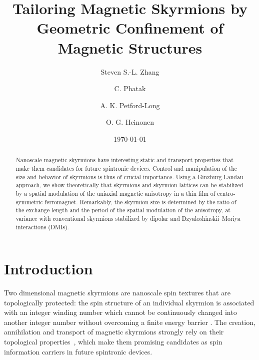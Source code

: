 \documentclass[10pt,onecolumn,prb,aps,notitlepage]{revtex4}
\begin{document}
\title{Tailoring Magnetic Skyrmions by Geometric Confinement of Magnetic Structures}
\author{Steven S.-L. Zhang}
\author{C. Phatak}
\author{A. K. Petford-Long}
\author{O. G. Heinonen}

\date{\today }

\begin{abstract}
Nanoscale magnetic skyrmions have interesting static and transport properties that make them candidates for future spintronic devices. 
Control and manipulation of the size and behavior of skyrmions is thus of crucial importance. Using a Ginzburg-Landau approach, we show theoretically that skyrmions and skyrmion lattices can be stabilized by a spatial modulation of the uniaxial magnetic anisotropy in a thin film of centro-symmetric ferromagnet. Remarkably, the skyrmion size is determined by the ratio of
the exchange length and the period of the spatial modulation of the anisotropy, at variance with conventional skyrmions stabilized by dipolar and Dzyaloshinskii--Moriya interactions (DMIs).
\end{abstract}

\maketitle

\section{Introduction}
Two dimensional
magnetic skyrmions are nanoscale spin textures that are
topologically protected: the spin structure of an
individual skyrmion is associated with an integer winding number which
cannot be continuously changed into another integer number without
overcoming a finite energy barrier%
\cite{Fert17NatComm-Sk-review,Muhlbauer09Sci_skyrmion,Nagaosa13Nat.Nano_Skyrmion,Hoffmann17RMP-sk,Miltat16PRB_Sk-TI-barrier}%
. The creation, annihilation and transport of magnetic skyrmions strongly
rely on their topological properties~\cite{Okubo12PRL_sk-fluc-ex,Heinze11NatPhys_sk-4spin,Jiang15Sci-bubble-sk,heinonen16PRB_sk-SH,Woo16NatMater_sk-thinFilm,Boulle16NatNano_sk-thinFilm,cd16SciRep_skyrm_CoPt}, which make them promising candidates
as spin information carriers in future spintronic devices.
\end{document}
